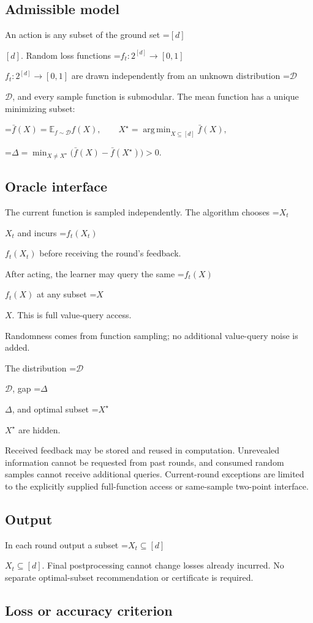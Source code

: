 \documentclass[10pt,a4paper]{article}
\newcommand{\AtlasMath}[1]{\par\begingroup\centering\setbox0=\hbox{$\displaystyle #1$}\ifdim\wd0>1.4\linewidth\typeout{ATLAS WIDE FORMULA: \the\wd0}\fi\ifdim\wd0>\linewidth\resizebox{\linewidth}{!}{\box0}\else\box0\fi\par\endgroup}
\newcommand{\AtlasInlineMath}[1]{\begingroup\setbox0=\hbox{$#1$}\ifdim\wd0>.4\linewidth\endgroup\AtlasMath{#1}\else\endgroup$#1$\fi}
\begin{document}
\subsection{Admissible model}
An action is any subset of the ground set \AtlasInlineMath{[d]}. Random loss functions \AtlasInlineMath{f_t:2^{[d]}\to[0,1]} are drawn independently from an unknown distribution \AtlasInlineMath{\mathcal{D}}, and every sample function is submodular. The mean function has a unique minimizing subset:


\AtlasMath{\bar f(X)=\mathbb{E}_{f\sim\mathcal{D}}f(X),\qquad X^\star=\operatorname*{arg\,min}_{X\subseteq[d]}\bar f(X),}



\AtlasMath{\Delta=\min_{X\ne X^\star}\bigl(\bar f(X)-\bar f(X^\star)\bigr)>0.}


\subsection{Oracle interface}
The current function is sampled independently. The algorithm chooses \AtlasInlineMath{X_t} and incurs \AtlasInlineMath{f_t(X_t)} before receiving the round's feedback.

After acting, the learner may query the same \AtlasInlineMath{f_t(X)} at any subset \AtlasInlineMath{X}. This is full value-query access.

Randomness comes from function sampling; no additional value-query noise is added.

The distribution \AtlasInlineMath{\mathcal{D}}, gap \AtlasInlineMath{\Delta}, and optimal subset \AtlasInlineMath{X^\star} are hidden.

Received feedback may be stored and reused in computation. Unrevealed information cannot be requested from past rounds, and consumed random samples cannot receive additional queries. Current-round exceptions are limited to the explicitly supplied full-function access or same-sample two-point interface.

\subsection{Output}
In each round output a subset \AtlasInlineMath{X_t\subseteq[d]}. Final postprocessing cannot change losses already incurred. No separate optimal-subset recommendation or certificate is required.

\subsection{Loss or accuracy criterion}
\end{document}
